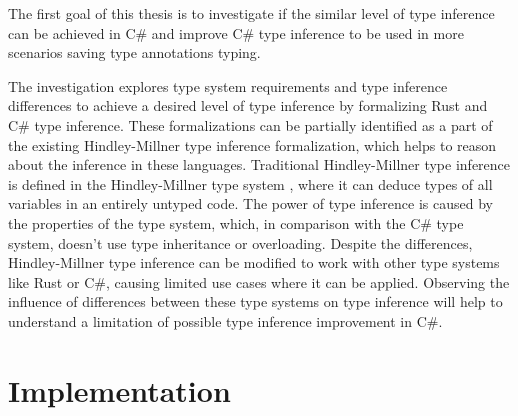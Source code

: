 The first goal of this thesis is to investigate if the similar level of type inference can be achieved in C\# and improve C\# type inference to be used in more scenarios saving type annotations typing.
\par
The investigation explores type system requirements and type inference differences to achieve a desired level of type inference by formalizing Rust and C\# type inference.
These formalizations can be partially identified as a part of the existing Hindley-Millner \cite{online:yHM} type inference formalization, which helps to reason about the inference in these languages.
Traditional Hindley-Millner type inference is defined in the Hindley-Millner type system \cite{online:wikiHM}, where it can deduce types of all variables in an entirely untyped code. 
The power of type inference is caused by the properties of the type system, which, in comparison with the C\# type system, doesn't use type inheritance or overloading. 
Despite the differences, Hindley-Millner type inference can be modified to work with other type systems like Rust or C\#, causing limited use cases where it can be applied.
Observing the influence of differences between these type systems on type inference will help to understand a limitation of possible type inference improvement in C\#.

\section{Implementation}

